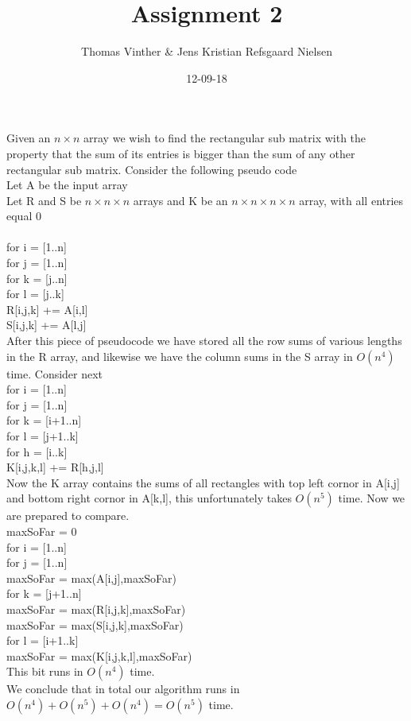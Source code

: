 \documentclass{article}
\theoremstyle{remark}
\numberwithin{equation}{section}
\begin{document}
	\author{Thomas Vinther \& Jens Kristian Refsgaard Nielsen}
	\title{Assignment 2}
	\date{12-09-18}
	\maketitle
\section*{}
Given an $n\times n$ array we wish to find the rectangular sub matrix with the property that the sum of its entries is bigger than the sum of any other rectangular sub matrix. Consider the following pseudo code\\
Let A be the input array \\
Let R and S be $n\times n\times n$ arrays and K be an $n\times n\times n\times n$ array, with all entries equal $0$ \\
\\for i = [1..n]
\\\indent for j = [1..n]
\\\indent\indent for k = [j..n]
\\\indent\indent\indent for l = [j..k]
\\\indent\indent\indent\indent R[i,j,k] += A[i,l]
\\\indent\indent\indent\indent S[i,j,k] += A[l,j]
\\After this piece of pseudocode we have stored all the row sums of various lengths in the R array, and likewise we have the column sums in the S array in $O(n^4)$ time. Consider next
\\for i = [1..n]
\\\indent for j = [1..n]
\\\indent\indent for k = [i+1..n]
\\\indent\indent\indent for l = [j+1..k]
\\\indent\indent\indent\indent for h = [i..k]
\\\indent\indent\indent\indent\indent K[i,j,k,l] += R[h,j,l]
\\Now the K array contains the sums of all rectangles with top left cornor in A[i,j] and bottom right cornor in A[k,l], this unfortunately takes $O(n^5)$ time. Now we are prepared to compare.
\\maxSoFar = 0
\\for i = [1..n]
\\\indent for j = [1..n]
\\\indent\indent maxSoFar = max(A[i,j],maxSoFar)
\\\indent\indent for k = [j+1..n]
\\\indent\indent\indent maxSoFar = max(R[i,j,k],maxSoFar)
\\\indent\indent\indent maxSoFar = max(S[i,j,k],maxSoFar)
\\\indent\indent\indent for l = [i+1..k]
\\\indent\indent\indent\indent maxSoFar = max(K[i,j,k,l],maxSoFar)
\\This bit runs in $O(n^4)$ time.
\\We conclude that in total our algorithm runs in $O(n^4)+O(n^5)+O(n^4) = O(n^5)$ time.
\end{document}
